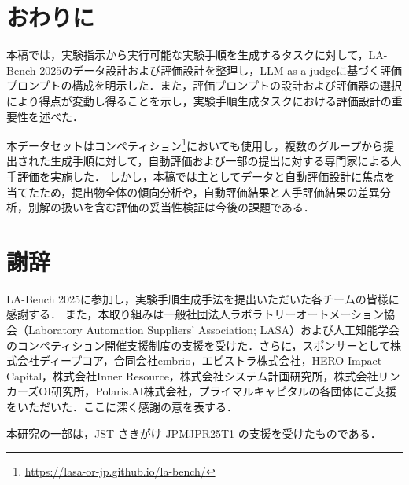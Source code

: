\documentclass[twocolumn]{jarticle}
\begin{document}
\section{おわりに}
本稿では，実験指示から実行可能な実験手順を生成するタスクに対して，LA-Bench 2025のデータ設計および評価設計を整理し，LLM-as-a-judgeに基づく評価プロンプトの構成を明示した．また，評価プロンプトの設計および評価器の選択により得点が変動し得ることを示し，実験手順生成タスクにおける評価設計の重要性を述べた．

本データセットはコンペティション\footnote{\url{https://lasa-or-jp.github.io/la-bench/}}においても使用し，複数のグループから提出された生成手順に対して，自動評価および一部の提出に対する専門家による人手評価を実施した．
しかし，本稿では主としてデータと自動評価設計に焦点を当てたため，提出物全体の傾向分析や，自動評価結果と人手評価結果の差異分析，別解の扱いを含む評価の妥当性検証は今後の課題である．

\section*{謝辞}
LA-Bench 2025に参加し，実験手順生成手法を提出いただいた各チームの皆様に感謝する．
また，本取り組みは一般社団法人ラボラトリーオートメーション協会（Laboratory Automation Suppliers' Association; LASA）および人工知能学会のコンペティション開催支援制度の支援を受けた．さらに，スポンサーとして株式会社ディープコア，合同会社embrio，エピストラ株式会社，HERO Impact Capital，株式会社Inner Resource，株式会社システム計画研究所，株式会社リンカーズOI研究所，Polaris.AI株式会社，プライマルキャピタルの各団体にご支援をいただいた．ここに深く感謝の意を表する．

本研究の一部は，JST さきがけ JPMJPR25T1 の支援を受けたものである．



\end{document}
